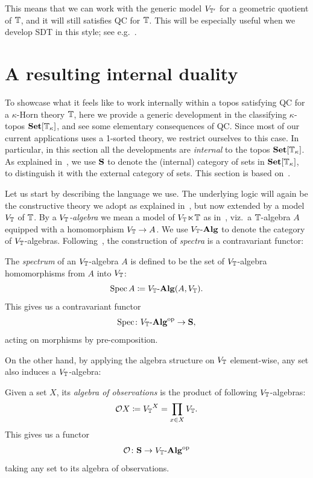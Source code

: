 This means that we can work with the generic model $V_{\mathbb{T}'}$ for a geometric quotient of $\mathbb{T}$, and it will still satisfies \gls{QC} for $\mathbb{T}$. This will be especially useful when we develop \gls{SDT} in this style; see e.g.~.

\section{A resulting internal duality}\label{sec:internalduality}

To showcase what it feels like to work internally within a topos satisfying \gls{QC} for a $\kappa$-Horn theory $\mathbb{T}$, here we provide a generic development in the classifying $\kappa$-topos $\mathbf{Set}[\mathbb{T}_\kappa]$, and see some elementary consequences of \gls{QC}. Since most of our current applications uses a 1-sorted theory, we restrict ourselves to this case. In particular, in this section all the developments are \emph{internal} to the topos $\mathbf{Set}[\mathbb{T}_\kappa]$. As explained in~, we use $\mathbf{S}$ to denote the (internal) category of sets in $\mathbf{Set}[\mathbb{T}_\kappa]$, to distinguish it with the external category of sets. This section is based on~\citet[Sec.~2]{sterling2025domains}.

Let us start by describing the language we use. The underlying logic will again be the constructive theory we adopt as explained in~, but now extended by a model $V_{\mathbb{T}}$ of $\mathbb{T}$. By a \emph{${V_{\mathbb{T}}}$-algebra} we mean a model of $V_{\mathbb{T}}\hspace{-.4ex}\ltimes\hspace{-.4ex}\mathbb{T}$ as in~, viz.\ a $\mathbb{T}$-algebra $A$ equipped with a homomorphism ${V_{\mathbb{T}}} \to A$. We use ${V_{\mathbb{T}}}\text{-}\mathbf{Alg}$ to denote the category of ${V_{\mathbb{T}}}$-algebras. Following~, the construction of \emph{spectra} is a contravariant functor:

\begin{definition}[Spectrum]
  The \emph{spectrum} of an ${V_{\mathbb{T}}}$-algebra $A$ is defined to be the set of ${V_{\mathbb{T}}}$-algebra homomorphisms from $A$ into ${V_{\mathbb{T}}}$:
  \[ \operatorname{Spec} A \coloneq {V_{\mathbb{T}}}\text{-}\mathbf{Alg}(A,{V_{\mathbb{T}}}). \]
  This gives us a contravariant functor 
  \[ \operatorname{Spec} \colon {V_{\mathbb{T}}}\text{-}\mathbf{Alg}^{\mathrm{op}} \to \mathbf{S}, \]
  acting on morphisms by pre-composition.
\end{definition}

On the other hand, by applying the algebra structure on $V_{\mathbb{T}}$ element-wise, any set also induces a $V_{\mathbb{T}}$-algebra:

\begin{definition}
  Given a set $X$, its \emph{algebra of observations} is the product of following ${V_{\mathbb{T}}}$-algebras:
  \[ 
    \mathcal{O} X \coloneq {V_{\mathbb{T}}}^X = \prod_{x\in X}{V_{\mathbb{T}}}.
  \] 
  This gives us a functor \[ \mathcal{O} \colon \mathbf{S} \to {V_{\mathbb{T}}}\text{-}\mathbf{Alg}^{\mathrm{op}} \]
  taking any set to its algebra of observations.
\end{definition}

